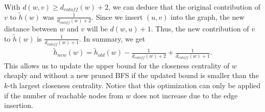 With $d(w, v) \geq d_{cutoff}(w) + 2$, we can deduce that the original contribution of $v$ to $\widetilde{h}(w)$ was $\frac{1}{d_{cutoff}(w) + 2}$. Since we insert $(u, v)$ into the graph, the new distance between $w$ and $v$ will be $d(w, u) + 1$. Thus, the new contribution of $v$ to $\widetilde{h}(w)$ is $\frac{1}{d_{cutoff}(w) + 1}$. In summary, we get
\begin{align}
	\widetilde{h}_{new}(w) = \widetilde{h}_{old}(w) - \frac{1}{d_{cutoff}(w) + 2} + \frac{1}{d_{cutoff}(w) + 1} \label{eq:cheapBoundaryUpdate}.
\end{align}
This allows us to update the upper bound for the closeness centrality of $w$ cheaply and without a new pruned BFS if the updated bound is smaller than the $k$-th largest closeness centrality. Notice that this optimization can only be applied if the number of reachable nodes from $w$ does not increase due to the edge insertion.



